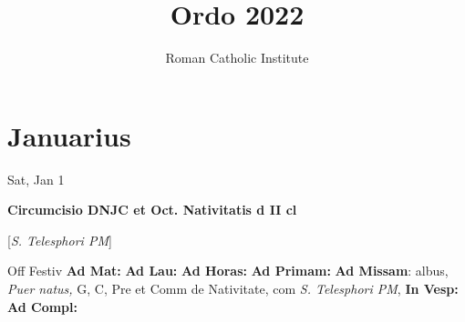 \documentclass[10pt]{book}
\title{Ordo 2022}
\author{Roman Catholic Institute}
\begin{document}
    \pagestyle{fancy}
    \maketitle
    \thispagestyle{empty}
    \clearpage
    \pagebreak
    

    \chapter*{Januarius}
                    
\begin{center}
\begin{minipage}{3.5in}
\vspace{2em}
\begin{center}Sat, Jan 1
\end{center}
\textbf{ \large Circumcisio DNJC et Oct. Nativitatis
\textnormal{\normalsize d II cl}}

[\textit{S. Telesphori PM}]

\begin{justify}Off Festiv
\textbf{Ad Mat: }
\textbf{Ad Lau: }
\textbf{Ad Horas: }
\textbf{Ad Primam: }\textbf{Ad Missam}: albus, \textit{Puer natus,} G, C, Pre et Comm de Nativitate, com \textit{S. Telesphori PM}, 
\textbf{In Vesp: }
\textbf{Ad Compl: }
\end{justify}
\end{minipage}
\end{center}
\end{document}
